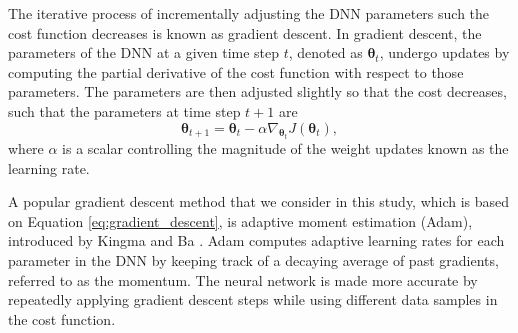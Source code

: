 The iterative process of incrementally adjusting the DNN parameters such the cost function decreases is known as gradient descent.
In gradient descent, the parameters of the DNN at a given time step $t$, denoted as $\bm{\theta}_t$, undergo updates by computing the partial derivative of the cost function with respect to those parameters. 
The parameters are then adjusted slightly so that the cost decreases, such that the parameters at time step $t+1$ are
\begin{equation}
    \bm{\theta}_{t+1} = \bm{\theta}_{t} - \alpha \nabla_{\bm{\theta}_t}J(\bm{\theta}_t),
    \label{eq:gradient_descent}
\end{equation}
where $\alpha$ is a scalar controlling the magnitude of the weight updates known as the learning rate.

A popular gradient descent method that we consider in this study, which is based on Equation \ref{eq:gradient_descent}, is adaptive moment estimation (Adam), introduced by Kingma and Ba \cite{kingma2015}. 
Adam computes adaptive learning rates for each parameter in the DNN by keeping track of a decaying average of past gradients, referred to as the momentum. 
The neural network is made more accurate by repeatedly applying gradient descent steps while using different data samples in the cost function.




